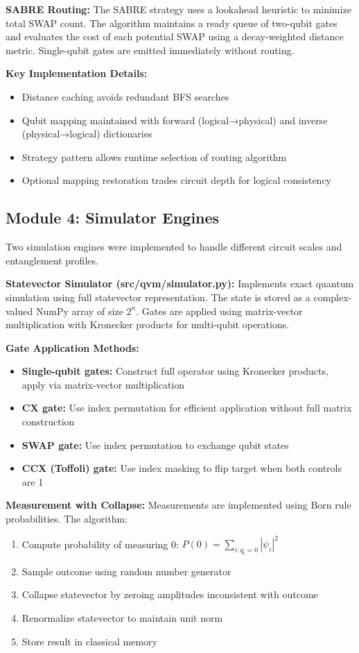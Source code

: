 \textbf{SABRE Routing:}
The SABRE strategy uses a lookahead heuristic to minimize total SWAP count. The algorithm maintains a ready queue of two-qubit gates and evaluates the cost of each potential SWAP using a decay-weighted distance metric. Single-qubit gates are emitted immediately without routing.

\textbf{Key Implementation Details:}
\begin{itemize}
\item Distance caching avoids redundant BFS searches
\item Qubit mapping maintained with forward (logical→physical) and inverse (physical→logical) dictionaries
\item Strategy pattern allows runtime selection of routing algorithm
\item Optional mapping restoration trades circuit depth for logical consistency
\end{itemize}

\subsection{Module 4: Simulator Engines}
Two simulation engines were implemented to handle different circuit scales and entanglement profiles.

\textbf{Statevector Simulator (src/qvm/simulator.py):}
Implements exact quantum simulation using full statevector representation. The state is stored as a complex-valued NumPy array of size $2^n$. Gates are applied using matrix-vector multiplication with Kronecker products for multi-qubit operations.

\textbf{Gate Application Methods:}
\begin{itemize}
\item \textbf{Single-qubit gates:} Construct full operator using Kronecker products, apply via matrix-vector multiplication
\item \textbf{CX gate:} Use index permutation for efficient application without full matrix construction
\item \textbf{SWAP gate:} Use index permutation to exchange qubit states
\item \textbf{CCX (Toffoli) gate:} Use index masking to flip target when both controls are 1
\end{itemize}

\textbf{Measurement with Collapse:}
Measurements are implemented using Born rule probabilities. The algorithm:
\begin{enumerate}
\item Compute probability of measuring 0: $P(0) = \sum_{i: q_i=0} |\psi_i|^2$
\item Sample outcome using random number generator
\item Collapse statevector by zeroing amplitudes inconsistent with outcome
\item Renormalize statevector to maintain unit norm
\item Store result in classical memory
\end{enumerate}

